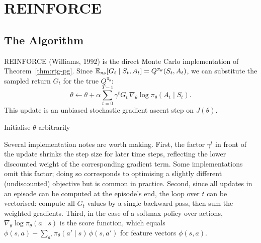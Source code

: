\section{REINFORCE}
\label{sec:reinforce}


\subsection{The Algorithm}

REINFORCE (Williams, 1992) is the direct Monte Carlo implementation of Theorem~\ref{thm:rtg-pg}.  Since $\operatorname{\mathbb{E}}_{\pi_\theta}[G_t \mid S_t, A_t] = Q^{\pi_\theta}(S_t, A_t)$, we can substitute the sampled return $G_t$ for the true $Q^{\pi_\theta}$:
\begin{equation}
\label{eq:reinforce-update}
\theta \leftarrow \theta + \alpha \sum_{t=0}^{T-1} \gamma^t G_t\, \nabla_\theta \log \pi_\theta(A_t \mid S_t).
\end{equation}
This update is an unbiased stochastic gradient ascent step on $J(\theta)$.

\begin{algorithm}[ht]
\caption{REINFORCE (Williams, 1992)}
\label{alg:reinforce}
Initialise $\theta$ arbitrarily\;
\end{algorithm}

Several implementation notes are worth making.  First, the factor $\gamma^t$ in front of the update shrinks the step size for later time steps, reflecting the lower discounted weight of the corresponding gradient term.  Some implementations omit this factor; doing so corresponds to optimising a slightly different (undiscounted) objective but is common in practice.  Second, since all updates in an episode can be computed at the episode's end, the loop over $t$ can be vectorised: compute all $G_t$ values by a single backward pass, then sum the weighted gradients.  Third, in the case of a softmax policy over actions, $\nabla_\theta \log \pi_\theta(a \mid s)$ is the score function, which equals $\phi(s,a) - \sum_{a'} \pi_\theta(a' \mid s)\, \phi(s,a')$ for feature vectors $\phi(s,a)$.

